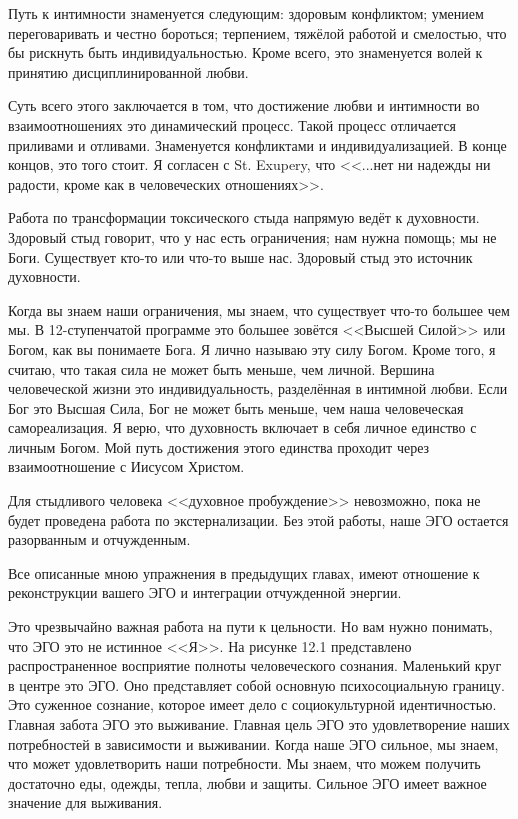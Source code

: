 \documentclass[10pt, fleqn]{article}
\begin{document}
Путь к интимности знаменуется следующим: здоровым конфликтом; умением переговаривать и честно бороться; терпением, тяжёлой работой и смелостью, что бы рискнуть быть индивидуальностью. Кроме всего, это знаменуется волей к принятию дисциплинированной любви.

Суть всего этого заключается в том, что достижение любви и интимности во взаимоотношениях это динамический процесс. Такой процесс отличается приливами и отливами. Знаменуется конфликтами и индивидуализацией. В конце концов, это того стоит. Я согласен с St. Exupery, что <<...нет ни надежды ни радости, кроме как в человеческих отношениях>>.


Работа по трансформации токсического стыда напрямую ведёт к духовности. Здоровый стыд говорит, что у нас есть ограничения; нам нужна помощь; мы не Боги. Существует кто-то или что-то выше нас. Здоровый стыд это источник духовности.

Когда вы знаем наши ограничения, мы знаем, что существует что-то большее чем мы. В 12-ступенчатой программе это большее зовётся <<Высшей Силой>> или Богом, как вы понимаете Бога. Я лично называю эту силу Богом. Кроме того, я считаю, что такая сила не может быть меньше, чем личной. Вершина человеческой жизни это индивидуальность, разделённая в интимной любви. Если Бог это Высшая Сила, Бог не может быть меньше, чем наша человеческая самореализация. Я верю, что духовность включает в себя личное единство с личным Богом. Мой путь достижения этого единства проходит через взаимоотношение с Иисусом Христом.

Для стыдливого человека <<духовное пробуждение>> невозможно, пока не будет проведена работа по экстернализации. Без этой работы, наше ЭГО остается разорванным и отчужденным.


Все описанные мною упражнения в предыдущих главах, имеют отношение к реконструкции вашего ЭГО и интеграции отчужденной энергии.

Это чрезвычайно важная работа на пути к цельности. Но вам нужно понимать, что ЭГО это не истинное <<Я>>. На рисунке 12.1 представлено распространенное восприятие полноты человеческого сознания. Маленький круг в центре это ЭГО. Оно представляет собой основную психосоциальную границу. Это суженное сознание, которое имеет дело с социокультурной идентичностью. Главная забота ЭГО это выживание. Главная цель ЭГО это удовлетворение наших потребностей в зависимости и выживании. Когда наше ЭГО сильное, мы знаем, что может удовлетворить наши потребности. Мы знаем, что можем получить достаточно еды, одежды, тепла, любви и защиты. Сильное ЭГО имеет важное значение для выживания.
\end{document}
